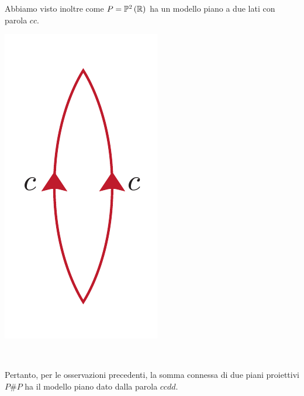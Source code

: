 \begin{observe}
	\begin{minipage}{.75\linewidth}
	Abbiamo visto inoltre come $P=\proj[2]{\realset}$ ha un modello piano a due lati con parola $cc$.
\end{minipage}
\begin{minipage}{.24\linewidth}
	\begin{center}
		\includegraphics[trim=0cm 0cm 0cm 0cm, clip, scale=0.3]{images/proj2lines.pdf}
	\end{center}
\end{minipage}\\
	\begin{minipage}{.75\linewidth}
	Pertanto, per le osservazioni precedenti, la somma connessa di due piani proiettivi $P\# P$ ha il modello piano dato dalla parola $ccdd$.
\end{minipage}
\begin{minipage}{.24\linewidth}
	\begin{center}

\end{center}
\end{minipage}
\end{observe}
